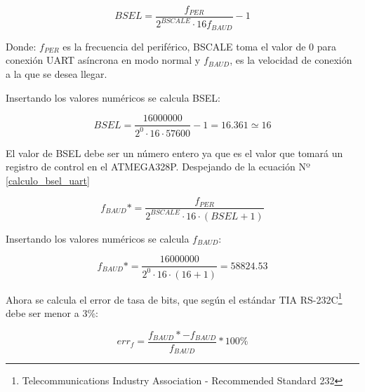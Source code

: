 \documentclass[../principal]{subfiles}
\begin{document}
  \vspace{-1.5em}
  \begin{equation}
    \label{calculo_bsel_uart}
    BSEL = \frac{f_{PER}}{2^{BSCALE} \cdot 16f_{BAUD}} - 1
  \end{equation}
  \vspace{-2em}

  Donde: $ f_{PER} $ es la frecuencia del periférico, BSCALE toma el valor de 0 para conexión UART asíncrona en modo normal y $ f_{BAUD} $, es la velocidad de conexión a la que se desea llegar.

  Insertando los valores numéricos se calcula BSEL:

  \vspace{-1.5em}
  \begin{equation}
    \label{calculo_numerico_bsel_uart}
    BSEL = \frac{16000000}{2^{0} \cdot 16 \cdot 57600} - 1 = 16.361 \simeq 16
  \end{equation}
  \vspace{-2em}

  El valor de BSEL debe ser un número entero ya que es el valor que tomará un registro de control en el ATMEGA328P. Despejando de la ecuación Nº \ref{calculo_bsel_uart}

  \vspace{-1.5em}
  \begin{equation}
    \label{calculo_numerico_uart}
    f_{BAUD}* = \frac{f_{PER}}{2^{BSCALE} \cdot 16 \cdot (BSEL + 1)}
  \end{equation}
  \vspace{-2em}

  Insertando los valores numéricos se calcula $ f_{BAUD} $:

  \vspace{-1.5em}
  \begin{equation}
    \label{calculo_numerico_f_baud}
    f_{BAUD}* = \frac{16000000}{2^{0} \cdot 16 \cdot (16 + 1)} = 58824.53
  \end{equation}
  \vspace{-2em}

  Ahora se calcula el error de tasa de bits, que según el estándar TIA RS-232C\footnote{Telecommunications Industry Association - Recommended Standard 232} debe ser menor a 3\%:

  \vspace{-1.5em}
  \begin{equation}
    \label{calculo_error_uart}
    err_{f} = \frac{f_{BAUD}* - f_{BAUD}}{f_{BAUD}} * 100\%
  \end{equation}
  \vspace{-2em}
\end{document}
